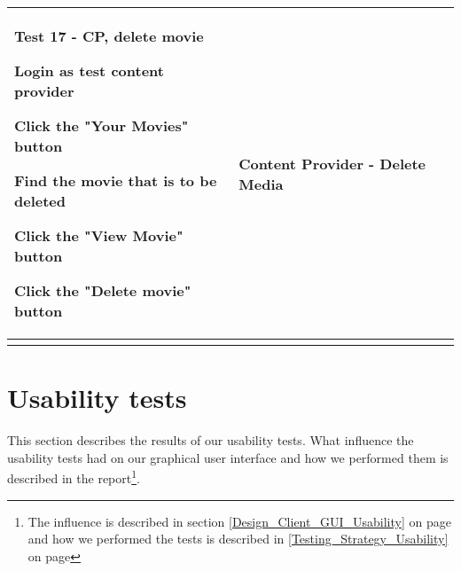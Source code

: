 \begin{centering}
\begin{longtable}{| p{5 cm} | p{7 cm} | c |}
\hline
Test 17 - CP, delete movie
\begin{my_enumerate}
\item Login as test content provider
\item Click the "Your Movies" button
\item Find the movie that is to be deleted
\item Click the "View Movie" button
\item Click the "Delete movie" button\end{my_enumerate} & Content Provider - Delete Media & \\

\hline
 & & \\
\hline
\end{longtable}
\end{centering}

\section{Usability tests}
\label{Appendix_Test_Usability}
This section describes the results of our usability tests. What influence the usability tests had on our graphical user interface and how we performed them is described in the report\footnote{The influence is described in section \ref {Design_Client_GUI_Usability} on page \pageref{Design_Client_GUI_Usability} and how we performed the tests is described in \ref{Testing_Strategy_Usability} on page \pageref{Testing_Strategy_Usability}}.